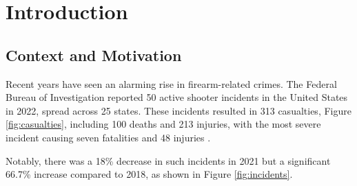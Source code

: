 \chapter{Introduction}
\label{chapter:introduction}

\newenvironment{introduction2}
{\quote\itshape}
{\endquote}

\begin{introduction2}
\end{introduction2}

\section{Context and Motivation}
Recent years have seen an alarming rise in firearm-related crimes. The Federal Bureau of Investigation reported 50 active shooter incidents in the United States in 2022, spread across 25 states. These incidents resulted in 313 casualties, Figure \ref{fig:casualties}, including 100 deaths and 213 injuries, with the most severe incident causing seven fatalities and 48 injuries \cite{rfc37}.

Notably, there was a 18\% decrease in such incidents in 2021 but a significant 66.7\% increase compared to 2018, as shown in Figure \ref{fig:incidents}.

